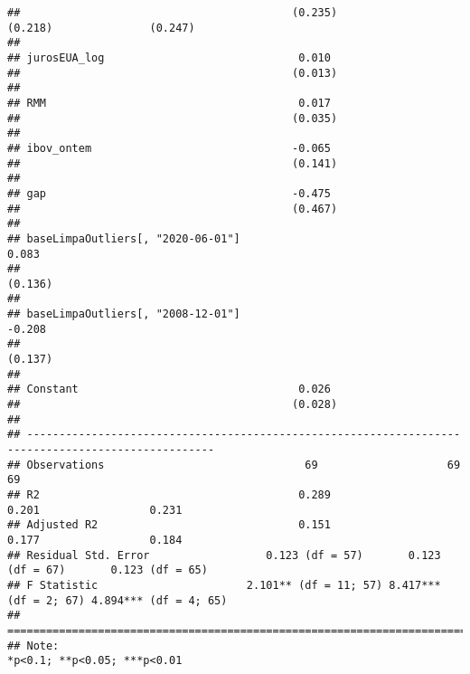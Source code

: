 \documentclass[
]{article}
\begin{document}
\begin{verbatim}
##                                          (0.235)               (0.218)               (0.247)       
##                                                                                                    
## jurosEUA_log                              0.010                                                    
##                                          (0.013)                                                   
##                                                                                                    
## RMM                                       0.017                                                    
##                                          (0.035)                                                   
##                                                                                                    
## ibov_ontem                               -0.065                                                    
##                                          (0.141)                                                   
##                                                                                                    
## gap                                      -0.475                                                    
##                                          (0.467)                                                   
##                                                                                                    
## baseLimpaOutliers[, "2020-06-01"]                                                     0.083        
##                                                                                      (0.136)       
##                                                                                                    
## baseLimpaOutliers[, "2008-12-01"]                                                    -0.208        
##                                                                                      (0.137)       
##                                                                                                    
## Constant                                  0.026                                                    
##                                          (0.028)                                                   
##                                                                                                    
## ---------------------------------------------------------------------------------------------------
## Observations                               69                    69                    69          
## R2                                        0.289                 0.201                 0.231        
## Adjusted R2                               0.151                 0.177                 0.184        
## Residual Std. Error                  0.123 (df = 57)       0.123 (df = 67)       0.123 (df = 65)   
## F Statistic                       2.101** (df = 11; 57) 8.417*** (df = 2; 67) 4.894*** (df = 4; 65)
## ===================================================================================================
## Note:                                                                   *p<0.1; **p<0.05; ***p<0.01
\end{verbatim}
\end{document}
